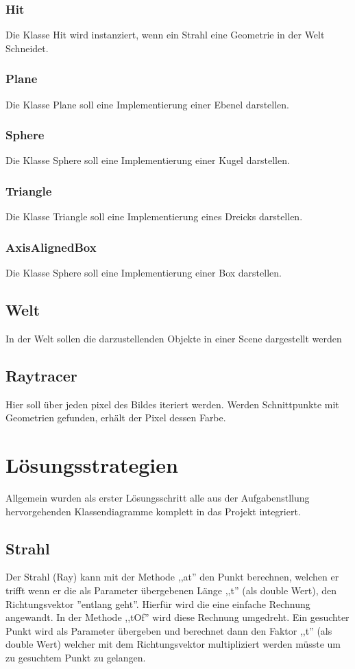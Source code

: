 \documentclass[14pt]{extarticle}
\begin{document}
\subsubsection{Hit}
Die Klasse Hit wird instanziert, wenn ein Strahl eine Geometrie in der Welt Schneidet.
\subsubsection{Plane}
Die Klasse Plane soll eine Implementierung einer Ebenel darstellen. 
\subsubsection{Sphere}
Die Klasse Sphere soll eine Implementierung einer Kugel darstellen. 
\subsubsection{Triangle}
Die Klasse Triangle soll eine Implementierung eines Dreicks darstellen. 
\subsubsection{AxisAlignedBox}
Die Klasse Sphere soll eine Implementierung einer Box darstellen. 
\subsection{Welt}
In der Welt sollen die darzustellenden Objekte in einer Scene dargestellt werden
\subsection{Raytracer}
Hier soll über jeden pixel des Bildes iteriert werden. Werden Schnittpunkte mit Geometrien gefunden, erhält der Pixel dessen Farbe.

\section{Lösungsstrategien}
Allgemein wurden als erster Lösungsschritt alle aus der Aufgabenstllung hervorgehenden Klassendiagramme komplett in das Projekt integriert.

\subsection{Strahl}
Der Strahl (Ray) kann mit der Methode ,,at'' den Punkt berechnen, welchen er trifft wenn er die als Parameter übergebenen Länge ,,t'' (als double Wert), den Richtungsvektor ''entlang geht''. Hierfür wird die eine einfache Rechnung angewandt. 
In der Methode ,,tOf'' wird diese Rechnung umgedreht. Ein gesuchter Punkt wird als Parameter übergeben und berechnet dann den Faktor ,,t'' (als double Wert) welcher mit dem Richtungsvektor multipliziert werden müsste um zu gesuchtem Punkt zu gelangen. \\
\end{document}
